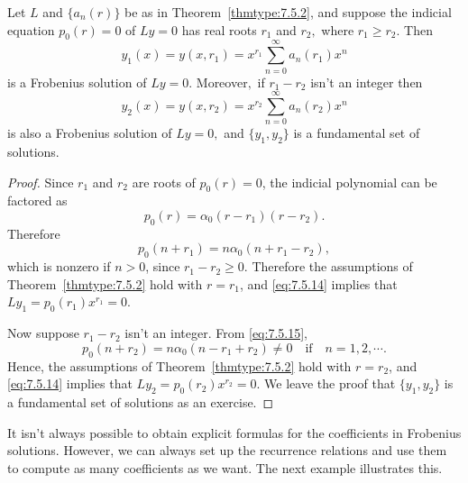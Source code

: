 \documentclass{ximera}
\begin{document}
\begin{theorem}\label{thmtype:7.5.3}
Let $L$ and $\{a_n(r)\}$ be as in Theorem~\ref{thmtype:7.5.2}, and
suppose the
indicial equation $p_0(r)=0$ of $Ly=0$ has real roots $r_1$ and $r_2,$
where $r_1\geq r_2.$ Then
$$
y_1(x)=y(x,r_1)=x^{r_1}\sum_{n=0}^\infty a_n(r_1)x^n
$$
is a Frobenius solution of $Ly=0$. Moreover$,$ if $r_1-r_2$ isn't  an
integer then
$$
y_2(x)=y(x,r_2)=x^{r_2}\sum_{n=0}^\infty a_n(r_2)x^n
$$
is also a Frobenius solution of $Ly=0,$
and $\{y_1,y_2\}$ is a fundamental set of solutions.
\end{theorem}

\begin{proof}
Since $r_1$ and $r_2$ are roots of $p_0(r)=0$, the indicial polynomial
can be factored as
\begin{equation} \label{eq:7.5.15}
p_0(r)=\alpha_0(r-r_1)(r-r_2).
\end{equation}
Therefore
$$
p_0(n+r_1)=n\alpha_0(n+r_1-r_2),
$$
which is nonzero if $n>0$, since $r_1-r_2\geq0$. Therefore the
assumptions of Theorem~\ref{thmtype:7.5.2} hold with $r=r_1$, and
\eqref{eq:7.5.14} implies that $Ly_1=p_0(r_1)x^{r_1}=0$.

Now suppose $r_1-r_2$ isn't  an integer. From \eqref{eq:7.5.15},
$$
p_0(n+r_2)=n\alpha_0(n-r_1+r_2)\neq 0\quad\mbox{if}\quad n=1,2,\cdots.
$$
Hence, the assumptions of Theorem~\ref{thmtype:7.5.2} hold with $r=r_2$,
and \eqref{eq:7.5.14} implies that $Ly_2=p_0(r_2)x^{r_2}=0$. We leave the
proof that $\{y_1,y_2\}$ is a fundamental set of solutions as an
exercise. %
\end{proof}

It isn't  always possible to obtain explicit formulas for the
coefficients in Frobenius solutions. However, we can always set up the
recurrence relations and use them to compute as many coefficients as we
want. The next example illustrates this.
\end{document}
